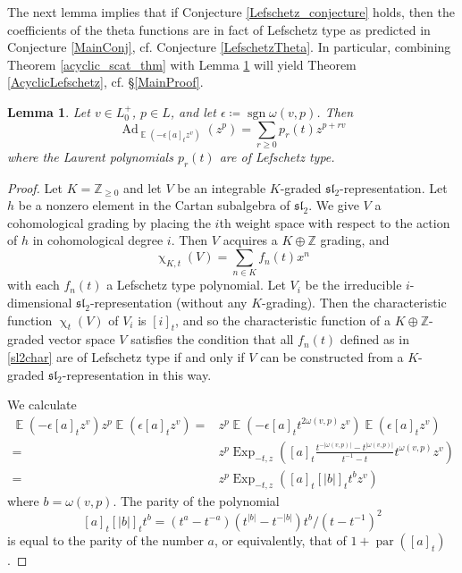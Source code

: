 \documentclass{amsart}
\DeclareMathOperator{\parit}{par}
\DeclareMathOperator{\sign}{sgn}
\DeclareMathOperator{\EE}{\mathbb{E}}
\DeclareMathOperator{\Ad}{Ad}
\DeclareMathOperator{\Exp}{Exp}
\renewcommand{\chi}{\upchi}
\theoremstyle{plain}%
\newtheorem{lem}[thm]{Lemma}
\theoremstyle{definition}
\theoremstyle{remark}
\begin{document}
The next lemma implies that if Conjecture \ref{Lefschetz_conjecture} holds, then the coefficients of the theta functions are in fact of Lefschetz type as predicted in Conjecture \ref{MainConj}, cf. Conjecture \ref{LefschetzTheta}.  In particular, combining Theorem \ref{acyclic_scat_thm} with Lemma \ref{Lefschetz_prop} will yield Theorem \ref{AcyclicLefschetz}, cf. \S \ref{MainProof}.


\begin{lem}\label{Lefschetz_prop}
Let $v\in L_0^+$, $p\in L$, and let $\epsilon\coloneqq \sign\omega(v,p)$.  Then 
\[
\Ad_{\EE\left(-\epsilon[a]_tz^v\right)}(z^p)=\sum_{r\geq 0} p_r(t)z^{p+rv}
\]
where the Laurent polynomials $p_r(t)$ are of Lefschetz type.
\end{lem}
\begin{proof}
Let $K=\mathbb{Z}_{\geq 0}$ and let $V$ be an integrable $K$-graded $\mathfrak{sl}_2$-representation.  Let $h$ be a nonzero element in the Cartan subalgebra of $\mathfrak{sl}_2$.  We give $V$ a cohomological grading by placing the $i$th weight space with respect to the action of $h$ in cohomological degree $i$.  Then $V$ acquires a $K\oplus \mathbb{Z}$ grading, and 
\begin{equation}
    \label{sl2char}
\chi_{K,t}(V)=\sum_{n\in K} f_n(t)x^n
\end{equation}
with each $f_n(t)$ a Lefschetz type polynomial.  Let $V_i$ be the irreducible $i$-dimensional $\mathfrak{sl}_2$-representation (without any $K$-grading).  Then the characteristic function $\chi_t(V)$ of $V_i$ is $[i]_t$, and so the characteristic function of a $K\oplus\mathbb{Z}$-graded vector space $V$ satisfies the condition that all $f_n(t)$ defined as in \eqref{sl2char} are of Lefschetz type if and only if $V$ can be constructed from a $K$-graded $\mathfrak{sl}_2$-representation in this way.

We calculate 
\begin{align}\label{deComp}
\EE\left(-\epsilon [a]_tz^v\right)z^p\EE\left(\epsilon[a]_tz^v\right)=&z^p\EE\left(-\epsilon[a]_tt^{2\omega(v,p)}z^v\right)\EE\left(\epsilon [a]_tz^v\right)\\ \nonumber
=&z^p\Exp_{-t,z}\left([a]_t\frac{t^{-\lvert \omega(v,p)\lvert}-t^{\lvert \omega(v,p)\lvert}}{t^{-1}-t}t^{\omega(v,p)}z^v\right)\\
=&z^p\Exp_{-t,z}\left([a]_t[|b|]_tt^{b}z^v\right)\label{unComp}
\end{align}
where $b=\omega(v,p)$.  The parity of the polynomial
\[
[a]_t[\lvert b\lvert]_tt^b=\left(t^a-t^{-a}\right)\left(t^{\lvert b\lvert}-t^{-\lvert b\lvert}\right)t^b/(t-t^{-1})^2
\]
is equal to the parity of the number $a$, or equivalently, that of $1+\parit([a]_t)$.


\end{proof}
\end{document}

